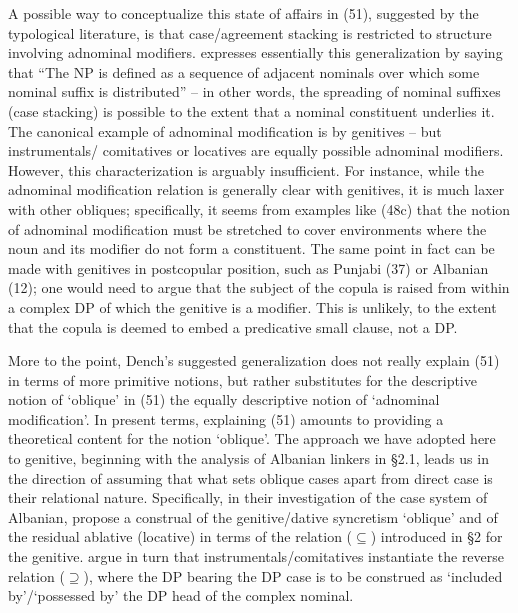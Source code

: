 \documentclass[output=paper]{langsci/langscibook}
\begin{document}
A possible way to conceptualize this state of affairs in (51), suggested by the typological literature, is that case\slash agreement stacking is restricted to structure involving adnominal modifiers. \citet[386]{Dench1995} expresses essentially this generalization by saying that “The NP is defined as a sequence of adjacent nominals over which some nominal suffix is distributed” – in other words, the spreading of nominal suffixes (case stacking) is possible to the extent that a nominal constituent underlies it. The canonical example of adnominal modification is by genitives – but instrumentals/ comitatives or locatives are equally possible adnominal modifiers. However, this characterization is arguably insufficient. For instance, while the adnominal modification relation is generally clear with genitives, it is much laxer with other obliques; specifically, it seems from examples like (48c) that the notion of adnominal modification must be stretched to cover environments where the noun and its modifier do not form a constituent. The same point in fact can be made with genitives in postcopular position, such as Punjabi (37) or Albanian (12); one would need to argue that the subject of the copula is raised from within a complex DP of which the genitive is a modifier. This is unlikely, to the extent that the copula is deemed to embed a predicative small clause, not a DP.

More to the point, Dench’s suggested generalization does not really explain (51) in terms of more primitive notions, but rather substitutes for the descriptive notion of ‘oblique’ in (51) the equally descriptive notion of ‘adnominal modification’. In present terms, explaining (51) amounts to providing a theoretical content for the notion ‘oblique’. The approach we have adopted here to genitive, beginning with the analysis of Albanian linkers in §2.1, leads us in the direction of assuming that what sets oblique cases apart from direct case is their relational nature. Specifically, in their investigation of the case system of Albanian, \citet{Manzini2011Grammatical,Manzini2011Reducing} propose a construal of the genitive\slash dative syncretism ‘oblique’ and of the residual ablative (locative) in terms of the relation ($\subseteq$) introduced in §2 for the genitive. \citet{Franco2015} argue in turn that instrumentals\slash comitatives instantiate the reverse relation ($\supseteq$), where the DP bearing the DP case is to be construed as ‘included by’/‘possessed by’ the DP head of the complex nominal. 
\end{document}
